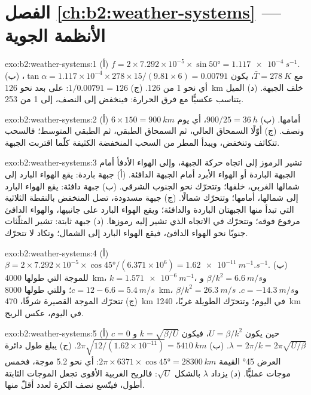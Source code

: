 \section*{الفصل \ref{ch:b2:weather-systems} --- الأنظمة الجوية}

\begin{solution}{exo:b2:weather-systems:1}
(أ) $f = 2 \times 7.292 \times 10^{-5} \times \sin\ang{50} = \qty{1.117e-4}{s^{-1}}$. (ب) مع
$\bar T = \qty{278}{K}$، يكون $\tan\alpha = 1.117 \times 10^{-4} \times 278 \times 15/(9.81 \times 6)
= 0.00791$، أي نحو 1 من 126. (ج) $1/0.00791 = 126$: على بعد نحو \qty{126}{km} خلف الجبهة. (د) الميل
يتناسب عكسيًّا مع فرق الحرارة: فينخفض إلى النصف، إلى 1 من 253.
\end{solution}

\begin{solution}{exo:b2:weather-systems:2}
(أ) $6 \times 150 = \qty{900}{km}$ أمامها. (ب) $900/25 = \qty{36}{h}$، أي يوم ونصف. (ج) أوّلًا
السمحاق العالي، ثم السمحاق الطبقي، ثم الطبقي المتوسط؛ فالسحب تتكاثف وتنخفض، ويبدأ المطر
من السحب المنخفضة الكثيفة كلّما اقتربت الجبهة.
\end{solution}

\begin{solution}{exo:b2:weather-systems:3}
تشير الرموز إلى اتجاه حركة الجبهة، وإلى الهواء الأدفأ أمام الجبهة الباردة أو
الهواء الأبرد أمام الجبهة الدافئة. (أ) جبهة باردة: يقع الهواء البارد إلى شمالها الغربي، خلفها؛
وتتحرّك نحو الجنوب الشرقي. (ب) جبهة دافئة: يقع الهواء البارد إلى شمالها، أمامها؛ وتتحرّك
شمالًا. (ج) جبهة مسدودة، تصل المنخفض بالنقطة الثلاثية التي تبدأ منها الجبهتان الباردة والدافئة؛
ويقع الهواء البارد على جانبيها، والهواء الدافئ مرفوع فوقه؛ وتتحرّك في الاتجاه الذي تشير إليه
رموزها. (د) جبهة ثابتة: تشير المثلّثات جنوبًا نحو الهواء الدافئ، فيقع الهواء البارد
إلى الشمال؛ وتكاد لا تتحرّك.
\end{solution}

\begin{solution}{exo:b2:weather-systems:4}
(أ) $\beta = 2 \times 7.292 \times 10^{-5} \times \cos\ang{45}/(6.371 \times 10^6) =
\qty{1.62e-11}{m^{-1}.s^{-1}}$. (ب) للموجة التي طولها \qty{4000}{km}، $k = \qty{1.571e-6}{m^{-1}}$، و$\beta/k^2 =
\qty{6.6}{m/s}$ و$c = 12 - 6.6 = \qty{5.4}{m/s}$؛ وللتي طولها \qty{8000}{km}، $\beta/k^2 =
\qty{26.3}{m/s}$ و$c = \qty{-14.3}{m/s}$. (ج) تتحرّك الموجة القصيرة شرقًا، \qty{470}{km} في اليوم؛
وتتحرّك الطويلة غربًا، \qty{1240}{km} في اليوم، عكس الريح.
\end{solution}

\begin{solution}{exo:b2:weather-systems:5}
(أ) $c = 0$ حين يكون $U = \beta/k^2$، فيكون $k = \sqrt{\beta/U}$ و$\lambda = 2\pi/k =
2\pi\sqrt{U/\beta}$. (ب) $2\pi\sqrt{12/(1.62 \times 10^{-11})} = \qty{5410}{km}$. (ج) يبلغ طول دائرة
العرض \ang{45} القيمة $2\pi \times 6371 \times \cos\ang{45} = \qty{28300}{km}$: أي نحو 5.2
موجة، فخمس موجات عمليًّا. (د) يزداد $\lambda$ بالشكل $\sqrt U$: فالريح الغربية الأقوى تجعل
الموجات الثابتة أطول، فيتّسع نصف الكرة لعدد أقلّ منها.
\end{solution}

